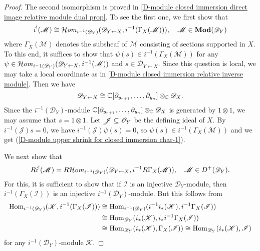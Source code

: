 \begin{proof}
The second isomorphism is proved in \cref{D-module closed immersion direct image relative module dual prop}. To see the first one, we first show that
\begin{equation}\label{D-module upper shrink for closed immersion char-1}
i^!(\mathscr{M})\cong\operatorname{\mathcal{H}\hspace*{-0.4pt}\textit{om}\hspace{0.5pt}}_{i^{-1}(\mathscr{D}_Y)}(\mathscr{D}_{Y\leftarrow X},i^{-1}(\Gamma_X(\mathscr{M}))),\quad \mathscr{M}\in\mathbf{Mod}(\mathscr{D}_Y)
\end{equation}
where $\Gamma_X(\mathscr{M})$ denotes the subsheaf of $\mathscr{M}$ consisting of sections supported in $X$. To this end, it suffices to show that $\psi(s)\in i^{-1}(\Gamma_X(\mathscr{M}))$ for any $\psi\in\operatorname{\mathcal{H}\hspace*{-0.4pt}\textit{om}\hspace{0.5pt}}_{i{^-1}(\mathscr{D}_Y)}(\mathscr{D}_{Y\leftarrow X},i^{-1}(\mathscr{M}))$ and $s\in\mathscr{D}_{Y\leftarrow X}$. Since this question is local, we may take a local coordinate as in \cref{D-module closed immersion relative inverse module}. Then we have
\[\mathscr{D}_{Y\leftarrow X}\cong\mathbb{C}[\partial_{y_{r+1}},\dots,\partial_{y_n}]\otimes_{\mathbb{C}}\mathscr{D}_X.\]
Since the $i^{-1}(\mathscr{D}_Y)$-module $\mathbb{C}[\partial_{y_{r+1}},\dots,\partial_{y_n}]\otimes_{\mathbb{C}}\mathscr{D}_X$ is generated by $1\otimes 1$, we may assume that $s=1\otimes 1$. Let $\mathscr{J}\subseteq\mathscr{O}_Y$ be the defining ideal of $X$. By $i^{-1}(\mathscr{J})s=0$, we have $i^{-1}(\mathscr{J})\psi(s)=0$, so $\psi(s)\in i^{-1}(\Gamma_X(\mathscr{M}))$ and we get (\ref{D-module upper shrink for closed immersion char-1}).\par
We next show that
\begin{equation}
Ri^!(\mathscr{M})=R\!\operatorname{\mathcal{H}\hspace*{-0.4pt}\textit{om}\hspace{0.5pt}}_{i^{-1}(\mathscr{D}_Y)}(\mathscr{D}_{Y\leftarrow X},i^{-1}R\Gamma_X(\mathscr{M})),\quad \mathscr{M}\in D^+(\mathscr{D}_Y).
\end{equation}
For this, it is sufficient to show that if $\mathscr{I}$ is an injective $\mathscr{D}_Y$-module, then $i^{-1}(\Gamma_X(\mathscr{I}))$ is an injective $i^{-1}(\mathscr{D}_Y)$-module. But this follows from
\begin{align*}
\mathrm{Hom}_{i^{-1}(\mathscr{D}_Y)}(\mathscr{K},i^{-1}(\Gamma_X(\mathscr{I})))&\cong \mathrm{Hom}_{i^{-1}(\mathscr{D}_Y)}(i^{-1}i_*(\mathscr{K}),i^{-1}\Gamma_X(\mathscr{I}))\\
&\cong \mathrm{Hom}_{\mathscr{D}_Y}(i_*(\mathscr{K}),i_*i^{-1}\Gamma_X(\mathscr{I}))\\
&\cong \mathrm{Hom}_{\mathscr{D}_Y}(i_*(\mathscr{K}),\Gamma_X(\mathscr{I}))\cong\mathrm{Hom}_{\mathscr{D}_Y}(i_*(\mathscr{K}),\mathscr{I})
\end{align*}
for any $i^{-1}(\mathscr{D}_Y)$-module $\mathscr{K}$.\par

\end{proof}
